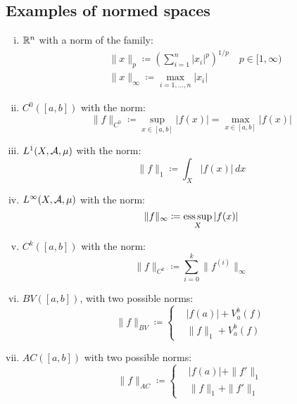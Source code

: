 \subsection{Examples of normed spaces}
\begin{enumerate}[i)]
    \item $\mathbb{R}^n$ with a norm of the family:
        \begin{align*}
            & \|x\|_p \coloneqq \left( \sum_{i=1}^n |x_i|^p \right)^{1/p} \quad p \in [1,\infty) \\
            & \|x\|_\infty \coloneqq \max_{i=1,\dots,n} |x_i|
        \end{align*}
    \item $C^0([a,b])$ with the norm:
        \begin{equation*}
            \|f\|_{C^0} \coloneqq \sup_{x \in [a,b]} |f(x)| = \max_{x \in [a,b]} |f(x)|
        \end{equation*}
    \item $L^1(X,\mathcal{A},\mu)$ with the norm:
        \begin{equation*}
            \|f\|_1 \coloneqq \int_X |f(x)| \, dx
        \end{equation*}
    \item $L^\infty(X,\mathcal{A},\mu)$ with the norm:
        \begin{equation*}
            \|f\|_\infty \coloneqq \operatorname*{ess\,sup}_X |f(x)|
        \end{equation*}
    \item $C^k([a,b])$ with the norm:
        \begin{equation*}
            \|f\|_{C^k} \coloneqq \sum_{i=0}^k \|f^{(i)}\|_{\infty}
        \end{equation*}
    \item $BV([a,b])$, with two possible norms:
        \begin{equation*}
            \|f\|_{BV} \coloneqq \begin{cases}
                & |f(a)| + V_a^b(f) \\
                & \|f\|_1 + V_a^b(f)
            \end{cases}
        \end{equation*}
    \item $AC([a,b])$ with two possible norms:
        \begin{equation*}
            \|f\|_{AC} \coloneqq \begin{cases}
                & |f(a)| + \|f'\|_1 \\
                & \|f\|_1 + \|f'\|_1

\end{cases}
\end{equation*}
\end{enumerate}
